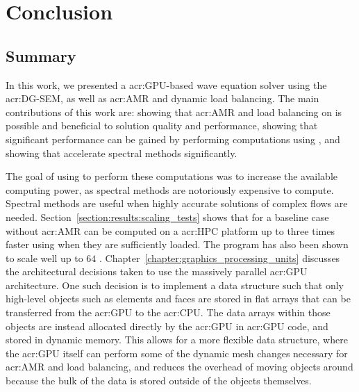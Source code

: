 \chapter{Conclusion}\label{chapter:conclusion}

\section{Summary}\label{section:conclusion:summary}

In this work, we presented a \acrshort{acr:GPU}-based wave equation solver using the
\acrlong{acr:DG-SEM}, as well as \acrlong{acr:AMR} and dynamic load balancing. The main
contributions of this work are: showing that \acrshort{acr:AMR} and load balancing on
 is possible and beneficial to solution quality and performance, showing that
significant performance can be gained by performing computations using , and
showing that  accelerate spectral methods significantly.

The goal of using  to perform these computations was to increase the available
computing power, as spectral methods are notoriously expensive to compute. Spectral methods are
useful when highly accurate solutions of complex flows are needed.
Section~\ref{section:results:scaling_tests} shows that for a baseline case without
\acrshort{acr:AMR} can be computed on a \acrshort{acr:HPC} platform up to three times faster using
 when they are sufficiently loaded. The program has also been shown to scale
well up to \(64\) . Chapter~\ref{chapter:graphics_processing_units} discusses
the architectural decisions taken to use the massively parallel \acrshort{acr:GPU} architecture. One
such decision is to implement a data structure such that only high-level objects such as elements
and faces are stored in flat arrays that can be transferred from the \acrshort{acr:GPU} to the
\acrshort{acr:CPU}. The data arrays within those objects are instead allocated directly by the
\acrshort{acr:GPU} in \acrshort{acr:GPU} code, and stored in dynamic memory. This allows for a more
flexible data structure, where the \acrshort{acr:GPU} itself can perform some of the dynamic mesh
changes necessary for \acrshort{acr:AMR} and load balancing, and reduces the overhead of moving
objects around because the bulk of the data is stored outside of the objects themselves.


